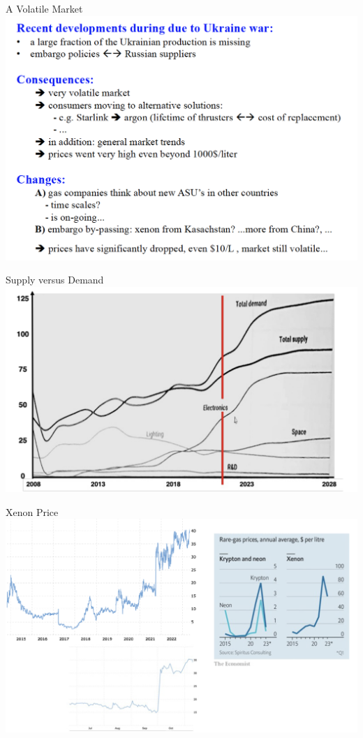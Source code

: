 \documentclass [aspectratio=169]{beamer}
\begin{document}
\begin{frame}{A Volatile Market}
\includegraphics[scale=0.25]{volatile.png}
\end{frame}


\begin{frame}{Supply versus Demand}
\includegraphics[scale=0.30]{xedemand.png}
\end{frame}


\begin{frame}{Xenon Price}
\includegraphics[scale=0.30]{xeprice.png}
\end{frame}
\end{document}
